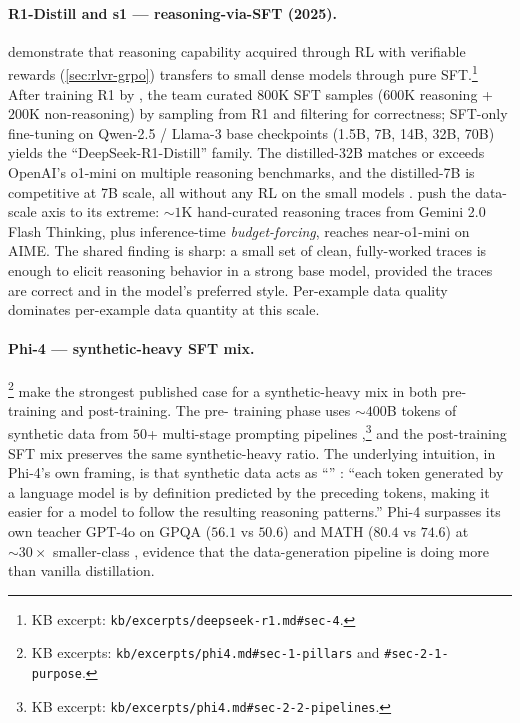 \paragraph{R1-Distill and s1 — reasoning-via-SFT (2025).}
\citet[\S 4]{deepseek-r1} demonstrate that reasoning capability
acquired through RL with verifiable rewards (\cref{sec:rlvr-grpo})
transfers to small dense models through pure SFT.\footnote{KB excerpt:
\texttt{kb/excerpts/deepseek-r1.md\#sec-4}.} After training R1 by ,
the team curated $800$K SFT samples ($600$K reasoning + $200$K
non-reasoning) by sampling from R1 and filtering for correctness;
SFT-only fine-tuning on Qwen-2.5 / Llama-3 base checkpoints (1.5B,
7B, 14B, 32B, 70B) yields the ``DeepSeek-R1-Distill'' family. The
distilled-32B matches or exceeds OpenAI's o1-mini on multiple reasoning
benchmarks, and the distilled-7B is competitive at 7B scale, all
without any RL on the small models \citep[\S 4]{deepseek-r1}.
\citet{s1-2025} push the data-scale axis to its extreme: $\sim\!1$K
hand-curated reasoning traces from Gemini 2.0 Flash Thinking, plus
inference-time \emph{budget-forcing}, reaches near-o1-mini on AIME.
The shared finding is sharp: a small set of clean, fully-worked 
traces is enough to elicit reasoning behavior in a strong base model,
provided the traces are correct and in the model's preferred style.
Per-example data quality dominates per-example data quantity at this
scale.

\paragraph{Phi-4 — synthetic-heavy SFT mix.} \citet[\S 1, \S
2.1]{phi4}\footnote{KB excerpts:
\texttt{kb/excerpts/phi4.md\#sec-1-pillars} and
\texttt{\#sec-2-1-purpose}.} make the strongest published case for a
synthetic-heavy mix in both pre-training and post-training. The pre-
training phase uses $\sim\!400$B tokens of synthetic data from $50$+
multi-stage prompting pipelines \citep[\S 2.2]{phi4},\footnote{KB
excerpt: \texttt{kb/excerpts/phi4.md\#sec-2-2-pipelines}.} and the
post-training SFT mix preserves the same synthetic-heavy ratio. The
underlying intuition, in Phi-4's own framing, is that synthetic data
acts as ``'' \citep[\S 2.1]{phi4}: ``each token generated
by a language model is by definition predicted by the preceding
tokens, making it easier for a model to follow the resulting reasoning
patterns.'' Phi-4 surpasses its own teacher GPT-4o on GPQA ($56.1$ vs
$50.6$) and MATH ($80.4$ vs $74.6$) at $\sim\!30\times$ smaller-class
\citep[\S 1]{phi4}, evidence that the data-generation pipeline is
doing more than vanilla distillation.

